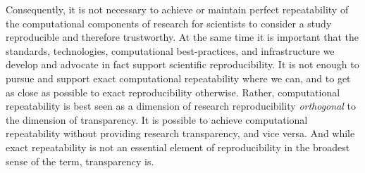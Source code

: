Consequently, it is not necessary to achieve or 
	maintain perfect repeatability of the computational components of research for scientists to 
	consider a study reproducible and therefore trustworthy.
At the same time it is important that the standards, technologies, 
	computational best-practices, and infrastructure we develop and advocate in fact support scientific reproducibility.
It is not enough to pursue and support exact computational repeatability where we can, and to get as close
	as possible to exact reproducibility otherwise.
Rather, computational repeatability is best seen as a dimension of research reproducibility \emph{orthogonal} to 
	the dimension of transparency.
It is possible to achieve computational repeatability without providing research transparency, and vice versa.
And while exact repeatability is not an essential element of reproducibility in the broadest sense of the term, transparency is.
